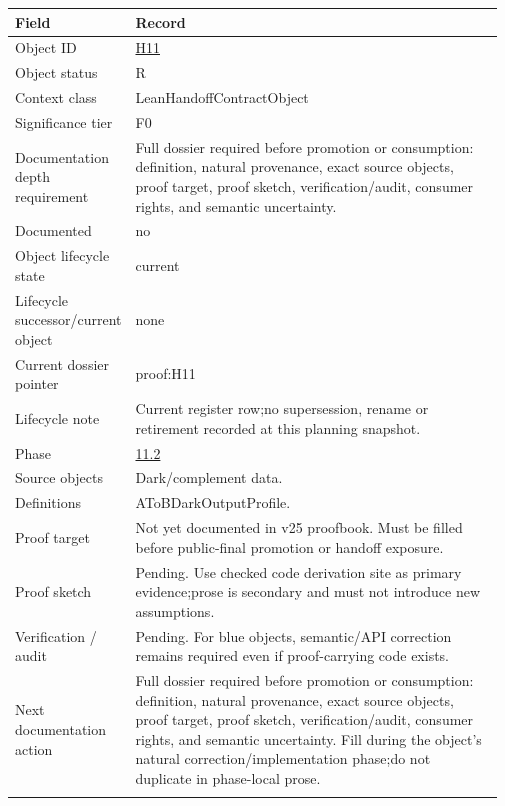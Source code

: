 \begin{longtable}{L{0.16\linewidth} L{0.81\linewidth}}
\hline
\textbf{Field} & \textbf{Record}\\
\hline
Object ID & \hyperlink{object-row-H11}{H11}\\
\hline\addlinespace[0.20em]
Object status & R\\
\hline\addlinespace[0.20em]
Context class & LeanHandoffContractObject\\
\hline\addlinespace[0.20em]
Significance tier & F0\\
\hline\addlinespace[0.20em]
Documentation depth requirement & Full dossier required before promotion or consumption: definition, natural provenance, exact source objects, proof target, proof sketch, verification/\allowbreak{}audit, consumer rights, and semantic uncertainty.\\
\hline\addlinespace[0.20em]
Documented & no\\
\hline\addlinespace[0.20em]
Object lifecycle state & current\\
\hline\addlinespace[0.20em]
Lifecycle successor/\allowbreak{}current object & none\\
\hline\addlinespace[0.20em]
Current dossier pointer & proof:H11\\
\hline\addlinespace[0.20em]
Lifecycle note & Current register row;\newline no supersession, rename or retirement recorded at this planning snapshot.\\
\hline\addlinespace[0.20em]
Phase & \hyperlink{phase-row-11-2}{11.2}\\
\hline\addlinespace[0.20em]
Source objects & Dark/\allowbreak{}complement data.\\
\hline\addlinespace[0.20em]
Definitions & AToBDarkOutputProfile.\\
\hline\addlinespace[0.20em]
Proof target & Not yet documented in v25 proofbook. Must be filled before public-final promotion or handoff exposure.\\
\hline\addlinespace[0.20em]
Proof sketch & Pending. Use checked code derivation site as primary evidence;\newline prose is secondary and must not introduce new assumptions.\\
\hline\addlinespace[0.20em]
Verification /\allowbreak{} audit & Pending. For blue objects, semantic/\allowbreak{}API correction remains required even if proof-carrying code exists.\\
\hline\addlinespace[0.20em]
Next documentation action & Full dossier required before promotion or consumption: definition, natural provenance, exact source objects, proof target, proof sketch, verification/\allowbreak{}audit, consumer rights, and semantic uncertainty. Fill during the object's natural correction/\allowbreak{}implementation phase;\newline do not duplicate in phase-local prose.\\
\hline\addlinespace[0.20em]
\end{longtable}
